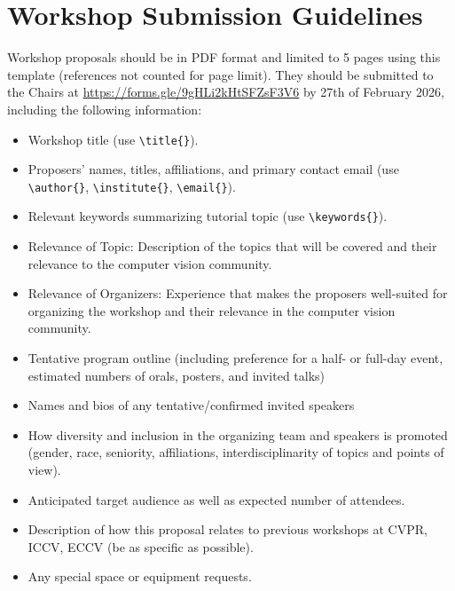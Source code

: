 \documentclass[runningheads]{llncs}
\begin{document}
{}


\section{Workshop Submission Guidelines}


Workshop proposals should be in PDF format and limited to 5 pages using this template (references not counted for page limit). They should be submitted to the Chairs at \url{https://forms.gle/9gHLi2kHtSFZsF3V6} by 27th of February 2026, including the following information:
\begin{itemize}
    \item Workshop title (use \verb!\title{}!).
    \item Proposers’ names, titles, affiliations, and primary contact email (use \verb!\author{}!, \verb!\institute{}!, \verb!\email{}!).
    \item Relevant keywords summarizing tutorial topic (use \verb!\keywords{}!).
    \item Relevance of Topic: Description of the topics that will be covered and their relevance to the computer vision community.
    \item Relevance of Organizers: Experience that makes the proposers well-suited for organizing the workshop and their relevance in the computer vision community.
    \item Tentative program outline (including preference for a half- or full-day event, estimated numbers of orals, posters, and invited talks)
    \item Names and bios of any tentative/confirmed invited speakers
    \item How diversity and inclusion in the organizing team and speakers is promoted (gender, race, seniority, affiliations, interdisciplinarity of topics and points of view).
    \item Anticipated target audience as well as expected number of attendees.
    \item Description of how this proposal relates to previous workshops at CVPR, ICCV, ECCV (be as specific as possible).
    \item Any special space or equipment requests.
\end{itemize}
\end{document}
